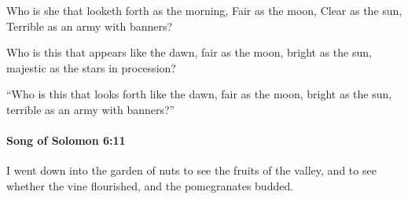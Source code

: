 			\begin{versebox}
					\item[BHS] 
					\item[LXX] 
					\item[ASV] Who is she that looketh forth as the morning, Fair as the moon, Clear as the sun, Terrible as an army with banners?
					\item[NIV] Who is this that appears like the dawn, fair as the moon, bright as the sun, majestic as the stars in procession?
					\item[NRSV] “Who is this that looks forth like the dawn, fair as the moon, bright as the sun, terrible as an army with banners?”
			\end{versebox}

		\paragraph{Song of Solomon 6:11} %
			\label{SONGOFSOLOMON-6-11}

			I went down into the garden of nuts to see the fruits of the valley, and to see whether the vine flourished, and the pomegranates budded.

